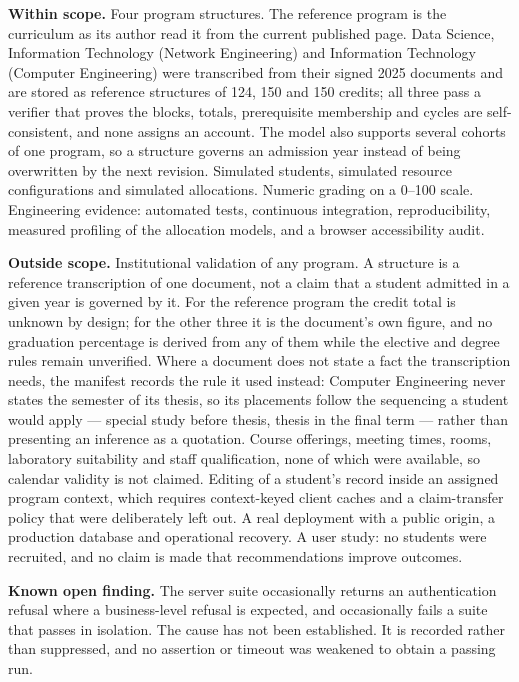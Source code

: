 \textbf{Within scope.} Four program structures. The reference program is the curriculum as its
author read it from the current published page. Data Science, Information Technology (Network
Engineering) and Information Technology (Computer Engineering) were transcribed from their signed
2025 documents and are stored as reference structures of 124, 150 and 150 credits; all three pass a
verifier that proves the blocks, totals, prerequisite membership and cycles are self-consistent, and
none assigns an account. The model also supports several cohorts of one program, so a structure
governs an admission year instead of being overwritten by the next revision. Simulated students,
simulated resource configurations and simulated allocations. Numeric grading on a 0--100 scale.
Engineering evidence: automated tests, continuous integration, reproducibility, measured profiling of
the allocation models, and a browser accessibility audit.

\textbf{Outside scope.} Institutional validation of any program. A structure is a reference
transcription of one document, not a claim that a student admitted in a given year is governed by
it. For the reference program the credit total is unknown by design; for the other three it is the
document's own figure, and no graduation percentage is derived from any of them while the elective
and degree rules remain unverified. Where a document does not state a fact the transcription needs,
the manifest records the rule it used instead: Computer Engineering never states the semester of its
thesis, so its placements follow the sequencing a student would apply --- special study before
thesis, thesis in the final term --- rather than presenting an inference as a quotation.
Course offerings, meeting times, rooms, laboratory suitability and staff
qualification, none of which were available, so calendar validity is not claimed. Editing of a
student's record inside an assigned program context, which requires context-keyed client caches
and a claim-transfer policy that were deliberately left out. A real deployment with a public
origin, a production database and operational recovery. A user study: no students were recruited,
and no claim is made that recommendations improve outcomes.

\textbf{Known open finding.} The server suite occasionally returns an authentication refusal where
a business-level refusal is expected, and occasionally fails a suite that passes in isolation. The
cause has not been established. It is recorded rather than suppressed, and no assertion or timeout
was weakened to obtain a passing run.

